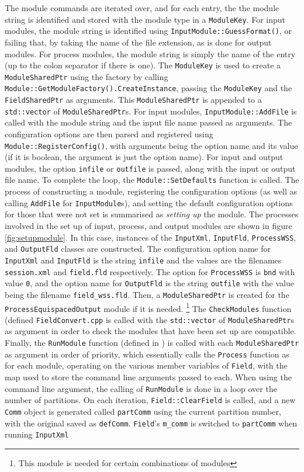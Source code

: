 The module commands are iterated over, and for each entry, the the module string is identified and stored with the module type in a \verb+ModuleKey+. For input modules, the module string is identified using \verb+InputModule::GuessFormat()+, or failing that, by taking the name of the file extension, as is done for output modules. For process modules, the module string is simply the name of the entry (up to the colon separator if there is one). The \verb+ModuleKey+ is used to create a \verb+ModuleSharedPtr+ using the factory by calling \verb+Module::GetModuleFactory().CreateInstance+, passing the \verb+ModuleKey+ and the \verb+FieldSharedPtr+ as arguments. This \verb+ModuleSharedPtr+ is appended to a \verb+std::vector+ of \verb+ModuleSharedPtr+s. For input modules, \verb+InputModule::AddFile+ is called with the module string and the input file name passed as arguments. The configuration options are then parsed and registered using \verb+Module::RegisterConfig()+, with arguments being the option name and its value (if it is boolean, the argument is just the option name). For input and output modules, the option \verb+infile+ or \verb+outfile+ is passed, along with the input or output file name. To complete the loop, the \verb+Module::SetDefaults+ function is called. The process of constructing a module, registering the configuration options (as well as calling \verb+AddFile+ for \verb+InputModule+s), and setting the default configuration options for those that were not set is summarised as \textit{setting up} the module. The processes involved in the set up of input, process, and output modules are shown in figure \ref{fig:setupmodule}. In this case, instances of the \verb+InputXml+, \verb+InputFld+, \verb+ProcessWSS+, and \verb+OutputFld+ classes are constructed. The configuration option name for \verb+InputXml+ and \verb+InputFld+ is the string \verb+infile+ and the values are the filenames \verb+session.xml+ and \verb+field.fld+ respectively. The option for \verb+ProcessWSS+ is \verb+bnd+ with value \verb+0+, and the option name for \verb+OutputFld+ is the string \verb+outfile+ with the value being the filename \verb+field_wss.fld+. Then, a \verb+ModuleSharedPtr+ is created for the \verb+ProcessEquispacedOutput+ module if it is needed. \footnote{This module is needed for certain combinations of modules} The \verb+CheckModules+ function (defined \verb+FieldConvert.cpp+ is called with the \verb+std::vector+ of \verb+ModuleSharedPtr+s as argument in order to check the modules that have been set up are compatible. Finally, the \verb+RunModule+ function (defined in ) is called with each \verb+ModuleSharedPtr+ as argument in order of priority, which essentially calls the \verb+Process+ function as for each module, operating on the various member variables of \verb+Field+, with the map used to store the command line arguments passed to each. When using the  command line argument, the calling of \verb+RunModule+ is done in a loop over the number of partitions. On each iteration, \verb+Field::ClearField+ is called, and a new \verb+Comm+ object is generated called \verb+partComm+ using the current partition number, with the original saved as \verb+defComm+. \verb+Field+'s \verb+m_comm+ is switched to \verb+partComm+ when running \verb+InputXml+ 
